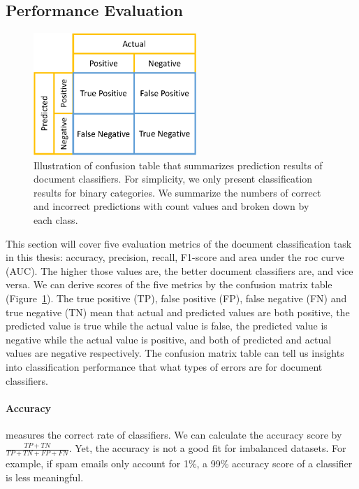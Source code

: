 \subsection{Performance Evaluation}
\label{chap2:subsec:eval}

\begin{figure}[t!]
\centering
\includegraphics[width=0.55\textwidth]{images/chapter2/confusion-table.pdf}
\caption{Illustration of confusion table that summarizes prediction results of document classifiers. For simplicity, we only present classification results for binary categories. We summarize the numbers of correct and incorrect predictions with count values and broken down by each class.}
\label{chap2:fig:confusion}
\end{figure}


This section will cover five evaluation metrics of the document classification task in this thesis: accuracy, precision, recall, F1-score and area under the roc curve (AUC).
The higher those values are, the better document classifiers are, and vice versa.
We can derive scores of the five metrics by the confusion matrix table (Figure~\ref{chap2:fig:confusion}). 
The true positive (TP), false positive (FP), false negative (FN) and true negative (TN) mean that actual and predicted values are both positive, the predicted value is true while the actual value is false, the predicted value is negative while the actual value is positive, and both of predicted and actual values are negative respectively.
The confusion matrix table can tell us insights into classification performance that what types of errors are for document classifiers.


\paragraph{Accuracy} measures the correct rate of classifiers. We can calculate the accuracy score by $\frac{TP+TN}{TP+TN+FP+FN}$. Yet, the accuracy is not a good fit for imbalanced datasets. For example, if spam emails only account for 1\%, a 99\% accuracy score of a classifier is less meaningful.


